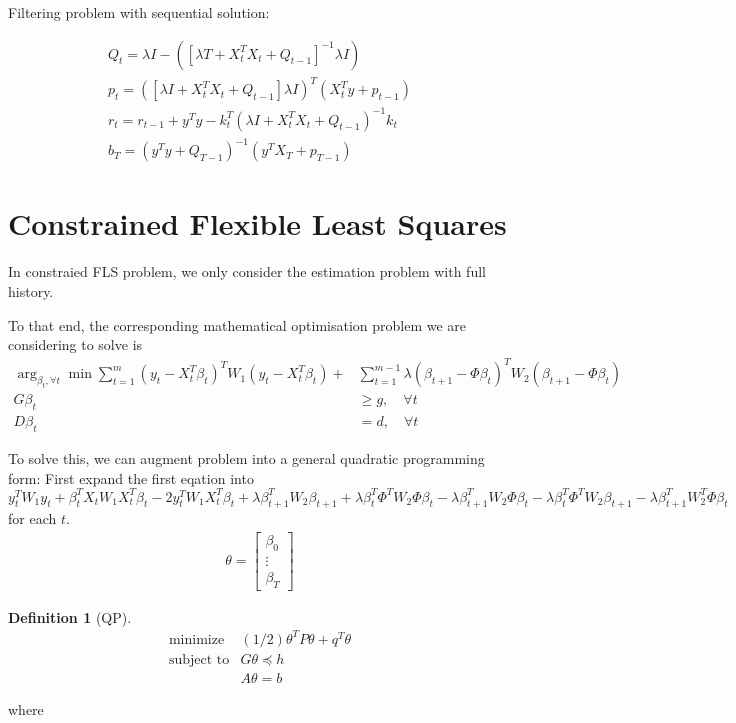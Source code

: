 \documentclass{article}
\theoremstyle{plain}
\theoremstyle{definition}
\newtheorem{defn}[thm]{Definition}
\theoremstyle{remark}
\begin{document}
Filtering problem with sequential solution:

\begin{eqnarray}
Q_t = \lambda {I - ([\lambda T + X_t^TX_t + Q_{t-1}]^{-1}\lambda I)}\\
p_t = ([\lambda I + X_t^TX_t + Q_{t-1}] \lambda I)^T (X_t^T y + p_{t-1})\\
r_t = r_{t-1} + y^T y - k_t ^T (\lambda I + X_t^TX_t + Q_{t-1})^{-1} k_t\\
b_T = (y^T y + Q_{T-1})^{-1} ( y^T X_T + p_{T-1})
\end{eqnarray}

\section{Constrained Flexible Least Squares}
In constraied FLS problem, we only consider the estimation problem with full history.

To that end, the corresponding mathematical optimisation problem we are considering to solve is
\begin{equation}
\begin{split}
\arg_{\beta_t,\forall t}\min\sum_{t = 1}^m (y_t - X^T_t \beta_t)^T W_1 (y_t - X^T_t \beta_t) +& \sum_{t=1}^{m-1}\lambda (\beta_{t+1} - \Phi \beta_t)^T W_2 (\beta_{t+1} - \Phi \beta_t)\\
G \beta_t & \geq g, \quad \forall t\\
D \beta_t & = d, \quad \forall t
\end{split}
\end{equation}

To solve this, we can augment problem into a general quadratic programming form:
First expand the first eqation into
\[
y_t^T W_1 y_t + \beta_t^T X_t W_1 X^T_t \beta_t - 2 y_t^T W_1 X^T_t \beta_t + 
\lambda \beta_{t+1}^T W_2 \beta_{t+1} + \lambda \beta_t^T \Phi^T W_2 \Phi \beta_t -  \lambda \beta_{t+1}^T W_2 \Phi \beta_t -  \lambda \beta_{t}^T \Phi^T W_2  \beta_{t+1} -  \lambda \beta_{t+1}^T W^T_2\Phi   \beta_{t} 
\]
for each $t$.
\begin{equation}
\begin{split}
\theta = \left[
\begin{array}{c}
\beta_{0}\\
\vdots\\
\beta_{T}
\end{array}
\right]
\end{split}
\end{equation}

\begin{defn}[QP]
\begin{eqnarray*}
\mbox{minimize} & (1/2) \theta^TP\theta + q^T \theta \\
\mbox{subject to} & G\theta \preceq h \\ & A\theta = b
\end{eqnarray*}
\end{defn}
where
\end{document}
